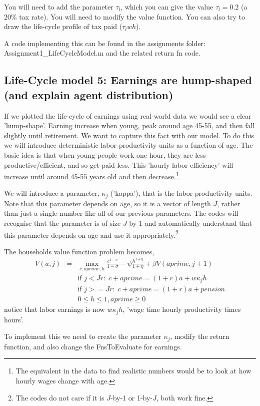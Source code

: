 You will need to add the parameter $\tau_l$, which you can give the value $\tau_l=0.2$ (a 20\% tax rate). You will need to modify the value function. You can also try to draw the life-cycle profile of tax paid ($\tau_l wh$).

A code implementing this can be found in the assignments folder: Assignment1\_{}LifeCycleModel.m and the related return fn code.
%
\subsection{Life-Cycle model 5: Earnings are hump-shaped (and explain agent distribution)}
If we plotted the life-cycle of earnings using real-world data we would see a clear 'hump-shape'. Earning increase when young, peak around age 45-55, and then fall slightly until retirement. We want to capture this fact with our model. To do this we will introduce deterministic labor productivity units as a function of age. The basic idea is that when young people work one hour, they are less productive/efficient, and so get paid less. This 'hourly labor efficiency' will increase until around 45-55 years old and then decrease.\footnote{The equivalent in the data to find realistic numbers would be to look at how hourly wages change with age.}

We will introduce a parameter, $\kappa_j$ ('kappa'), that is the labor productivity units. Note that this parameter depends on age, so it is a vector of length $J$, rather than just a single number like all of our previous parameters. The codes will recognise that the parameter is of size $J$-by-1 and automatically understand that this parameter depends on age and use it appropriately.\footnote{The codes do not care if it is $J$-by-1 or 1-by-$J$, both work fine.}

The households value function problem becomes,
\begin{eqnarray*}
 V(a,j)&=& \max_{c,aprime,h} \frac{c^{1-\sigma}}{1-\sigma} - \psi \frac{h^{1+\eta}}{1+\eta}  + \beta V(aprime,j+1) \\
&& \text{if }j<Jr: \; c+aprime=(1+r)a+w \kappa_j h \\
&& \text{if }j>=Jr: \; c+aprime=(1+r)a +pension\\
&& 0\leq h \leq 1, aprime\geq 0
\end{eqnarray*}
notice that labor earnings is now $w \kappa_j h$, 'wage time hourly productivity times hours'.

To implement this we need to create the parameter $\kappa_j$, modify the return function, and also change the FnsToEvaluate for earnings.

